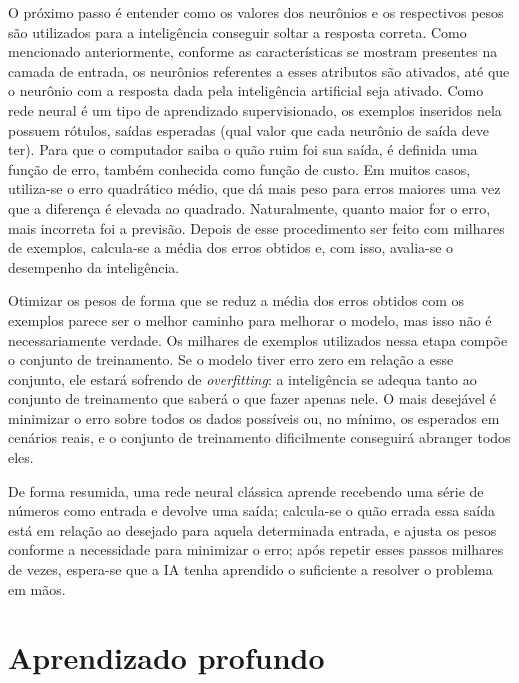 O próximo passo é entender como os valores dos neurônios e os respectivos pesos são utilizados para a inteligência conseguir soltar a resposta correta.
Como mencionado anteriormente, conforme as características se mostram presentes na camada de entrada, os neurônios referentes a esses atributos são ativados, até que o neurônio com a resposta dada pela inteligência artificial seja ativado.
Como rede neural é um tipo de aprendizado supervisionado, os exemplos inseridos nela possuem rótulos, saídas esperadas (qual valor que cada neurônio de saída deve ter).
Para que o computador saiba o quão ruim foi sua saída, é definida uma função de erro, também conhecida como função de custo.
Em muitos casos, utiliza-se o erro quadrático médio, que dá mais peso para erros maiores uma vez que a diferença é elevada ao quadrado.
Naturalmente, quanto maior for o erro, mais incorreta foi a previsão.
Depois de esse procedimento ser feito com milhares de exemplos, calcula-se a média dos erros obtidos e, com isso, avalia-se o desempenho da inteligência.

Otimizar os pesos de forma que se reduz a média dos erros obtidos com os exemplos parece ser o melhor caminho para melhorar o modelo, mas isso não é necessariamente verdade.
Os milhares de exemplos utilizados nessa etapa compõe o conjunto de treinamento.
Se o modelo tiver erro zero em relação a esse conjunto, ele estará sofrendo de \textit{overfitting}: a inteligência se adequa tanto ao conjunto de treinamento que saberá o que fazer apenas nele.
O mais desejável é minimizar o erro sobre todos os dados possíveis ou, no mínimo, os esperados em cenários reais, e o conjunto de treinamento dificilmente conseguirá abranger todos eles.

De forma resumida, uma rede neural clássica aprende recebendo uma série de números como entrada e devolve uma saída;
calcula-se o quão errada essa saída está em relação ao desejado para aquela determinada entrada, e ajusta os pesos conforme a necessidade para minimizar o erro;
após repetir esses passos milhares de vezes, espera-se que a IA tenha aprendido o suficiente a resolver o problema em mãos.


\section{Aprendizado profundo}
\label{sec:dl}

